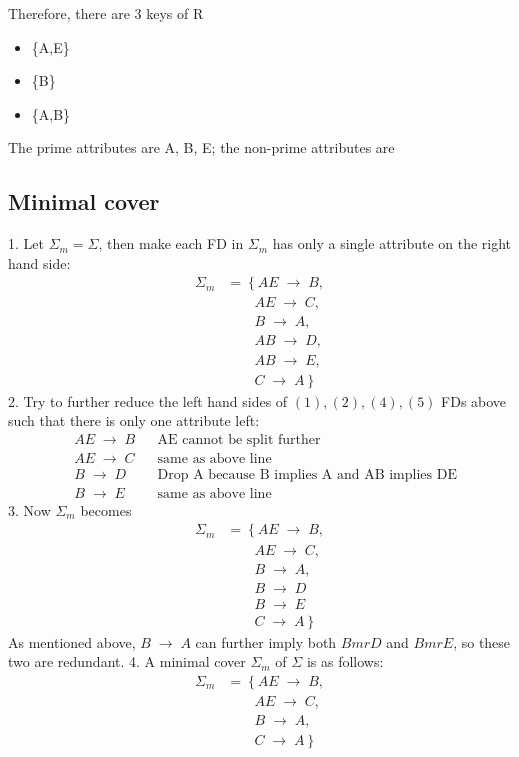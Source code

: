 \documentclass[12pt, a4paper]{article}
\newcommand{\mr}{\;\rightarrow\;}
\begin{document}
Therefore, there are 3 keys of R
\begin{itemize}[noitemsep]
\item \{A,E\}
\item \{B\}
\item \{A,B\}
\end{itemize}
The prime attributes are A, B, E; the non-prime attributes are \label{sol:1}
\subsection{Minimal cover}
1. Let \(\Sigma_{m} = \Sigma\), then make each FD in \(\Sigma_{m}\) has only a single attribute on the right hand side:
\begin{align}
  \Sigma_{m} & = \left\{AE \mr B,\right. \\
             & \qquad AE \mr C, \\
             & \qquad B \mr A, \\
  & \qquad AB \mr D, \\
  & \qquad AB \mr E, \\
  & \qquad \left. C \mr A \right \}
\end{align}
2. Try to further reduce the left hand sides of \((1), (2), (4), (5)\) FDs above such that there is only one attribute left:
\begin{align*}
  & AE \mr B && \text{AE cannot be split further} \\
  & AE \mr C && \text{same as above line} \\
  & B \mr D && \text{Drop A because B implies A and AB implies DE} \\
  & B \mr E && \text{same as above line}
\end{align*}
3. Now \(\Sigma_{m}\) becomes
\begin{align*}
  \Sigma_{m} & = \left\{AE \mr B,\right. \\
             & \qquad AE \mr C, \\
             & \qquad B \mr A, \\
             & \qquad B \mr D  \\
             & \qquad B \mr E \\
             & \qquad \left. C \mr A \right \}
\end{align*}
As mentioned above, \(B \mr A\) can further imply both \(B mr D\) and \(B mr E\), so these two are redundant.
4. A minimal cover \(\Sigma_{m}\) of \(\Sigma\) is as follows:
\begin{align*}
  \Sigma_{m} & = \left\{AE \mr B,\right. \\
             & \qquad AE \mr C, \\
             & \qquad B \mr A, \\
             & \qquad\left.C \mr A \right \}
\end{align*}
\end{document}
